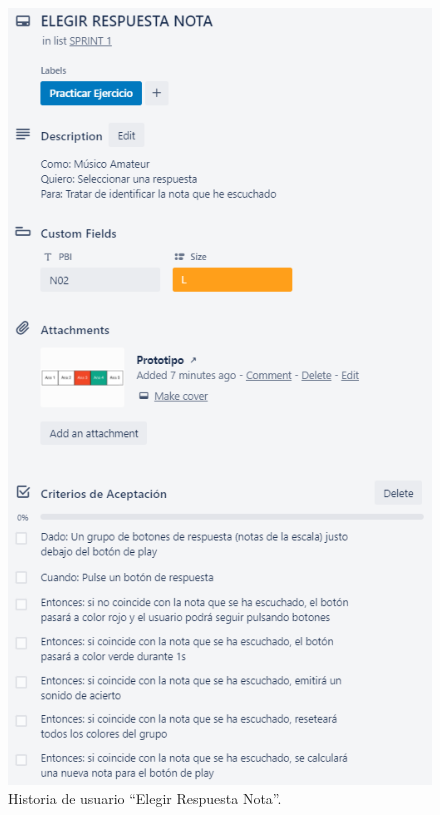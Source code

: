 \documentclass[12pt,twoside,titlepage]{report}
\begin{document}
\begin{figure}[H]
    \centering
    \includegraphics[scale=1.3]{Scrum/User Stories/NotasRespuestas}
    \caption{Historia de usuario ``Elegir Respuesta Nota''.}
    \label{fig:NotasRespuestas}
\end{figure}
\end{document}
